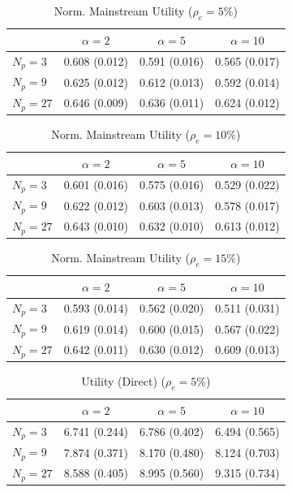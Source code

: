 \begin{table}[htbp]
\centering
\begin{tabular}{lccc}
\toprule
 & $\alpha=2$ & $\alpha=5$ & $\alpha=10$ \\
\midrule
$N_p=3$ & 0.608 (0.012) & 0.591 (0.016) & 0.565 (0.017) \\
$N_p=9$ & 0.625 (0.012) & 0.612 (0.013) & 0.592 (0.014) \\
$N_p=27$ & 0.646 (0.009) & 0.636 (0.011) & 0.624 (0.012) \\
\bottomrule
\end{tabular}
\caption{Norm. Mainstream Utility ($\rho_e=5\%$)}
\label{tab:exp2_norm_utility_mainstream_rho5}
\end{table}


\begin{table}[htbp]
\centering
\begin{tabular}{lccc}
\toprule
 & $\alpha=2$ & $\alpha=5$ & $\alpha=10$ \\
\midrule
$N_p=3$ & 0.601 (0.016) & 0.575 (0.016) & 0.529 (0.022) \\
$N_p=9$ & 0.622 (0.012) & 0.603 (0.013) & 0.578 (0.017) \\
$N_p=27$ & 0.643 (0.010) & 0.632 (0.010) & 0.613 (0.012) \\
\bottomrule
\end{tabular}
\caption{Norm. Mainstream Utility ($\rho_e=10\%$)}
\label{tab:exp2_norm_utility_mainstream_rho10}
\end{table}


\begin{table}[htbp]
\centering
\begin{tabular}{lccc}
\toprule
 & $\alpha=2$ & $\alpha=5$ & $\alpha=10$ \\
\midrule
$N_p=3$ & 0.593 (0.014) & 0.562 (0.020) & 0.511 (0.031) \\
$N_p=9$ & 0.619 (0.014) & 0.600 (0.015) & 0.567 (0.022) \\
$N_p=27$ & 0.642 (0.011) & 0.630 (0.012) & 0.609 (0.013) \\
\bottomrule
\end{tabular}
\caption{Norm. Mainstream Utility ($\rho_e=15\%$)}
\label{tab:exp2_norm_utility_mainstream_rho15}
\end{table}


\begin{table}[htbp]
\centering
\begin{tabular}{lccc}
\toprule
 & $\alpha=2$ & $\alpha=5$ & $\alpha=10$ \\
\midrule
$N_p=3$ & 6.741 (0.244) & 6.786 (0.402) & 6.494 (0.565) \\
$N_p=9$ & 7.874 (0.371) & 8.170 (0.480) & 8.124 (0.703) \\
$N_p=27$ & 8.588 (0.405) & 8.995 (0.560) & 9.315 (0.734) \\
\bottomrule
\end{tabular}
\caption{Utility (Direct) ($\rho_e=5\%$)}
\label{tab:exp2_avg_utility_gov_direct_rho5}
\end{table}


